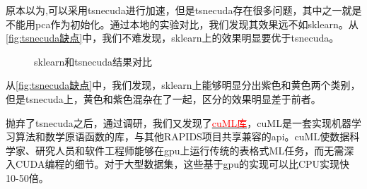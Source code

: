 \documentclass[12pt,hyperref,a4paper,UTF8]{ctexart}
\begin{document}
{\par
原本以为,可以采用tsnecuda进行加速，但是tsnecuda存在很多问题，其中之一就是不能用pca作为初始化。通过本地的实验对比，我们发现其效果远不如sklearn。从\autoref{fig:tsnecuda缺点}中，我们不难发现，sklearn上的效果明显要优于tsnecuda。
\begin{figure}[htbp]
	\centering
	\caption{sklearn和tsnecuda结果对比}
	\label{fig:tsnecuda缺点}
\end{figure}

从\autoref{fig:tsnecuda缺点}中，我们发现，sklearn上能够明显分出紫色和黄色两个类别，但是tsnecuda上，黄色和紫色混杂在了一起，区分的效果明显差于前者。

\par
抛弃了tsnecuda之后，通过调研，我们又发现了\href{https://github.com/rapidsai/cuml}{\textcolor{red}{cuML库}}，cuML是一套实现机器学习算法和数学原语函数的库，与其他RAPIDS项目共享兼容的api。cuML使数据科学家、研究人员和软件工程师能够在gpu上运行传统的表格式ML任务，而无需深入CUDA编程的细节。对于大型数据集，这些基于gpu的实现可以比CPU实现快10-50倍。

}
\end{document}
